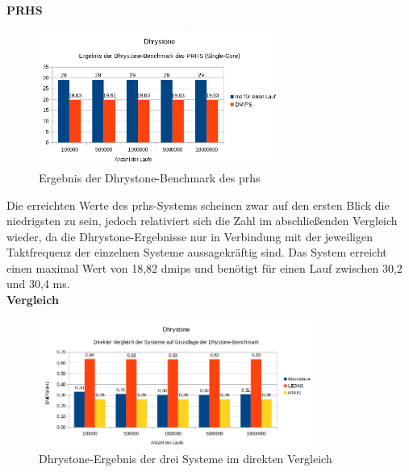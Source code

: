 \textbf{PRHS}

\begin{figure}[H]
\centering
\includegraphics[width=0.7\textwidth]{Hauptteil/dhrystonesingleprhs.png}
\caption{Ergebnis der Dhrystone-Benchmark des \ac{prhs}}
\label{fig:dhrystonesingleprhs}
\end{figure}

Die erreichten Werte des \ac{prhs}-Systems scheinen zwar auf den ersten Blick die niedrigsten zu sein, jedoch relativiert sich die Zahl im abschließenden Vergleich wieder, da die
Dhrystone-Ergebnisse nur in Verbindung mit der jeweiligen Taktfrequenz der einzelnen Systeme aussagekräftig sind. Das System erreicht einen maximal Wert von
18,82 \ac{dmips} und benötigt für einen Lauf zwischen 30,2 und 30,4 ms.\\

\newpage
\textbf{Vergleich}


\begin{figure}[H]
\centering
\includegraphics[width=0.8\textwidth]{Hauptteil/dhrystoneresult.png}
\caption{Dhrystone-Ergebnis der drei Systeme im direkten Vergleich}
\label{fig:dhrystoneresult}
\end{figure}

